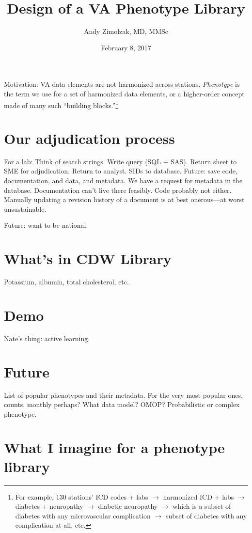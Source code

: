 \documentclass{tufte-handout}
\title{Design of a VA Phenotype Library}
\author{Andy Zimolzak, MD, MMSc}
\date{February 8, 2017}
\begin{document}
\maketitle

Motivation: VA data elements are not harmonized across stations.
\emph{Phenotype} is the term we use for a set of harmonized data
elements, or a higher-order concept made of many such ``building
blocks.''\footnote{For example, 130 stations' ICD codes + labs $\to$
  harmonized ICD + labs $\to$ diabetes + neuropathy $\to$ diabetic
  neuropathy $\to$ which is a subset of diabetes with any
  microvascular complication $\to$ subset of diabetes with any
  complication at all, etc.}

\section{Our adjudication process}

For a lab: Think of search strings. Write query (SQL + SAS). Return
sheet to SME for adjudication. Return to analyst. SIDs to database.
Future: save code, documentation, and data, and metadata. We have a
request for metadata in the database. Documentation can't live there
feasibly. Code probably not either. Manually updating a revision
history of a document is at best onerous---at worst unsustainable.

Future: want to be national.  


\section{What's in CDW Library}

Potassium, albumin, total cholesterol, etc. 

\section{Demo}

Nate's thing: active learning.

\section{Future}

List of popular phenotypes and their metadata. For the very most
popular ones, counts, monthly perhaps? What data model? OMOP?
Probabilistic or complex phenotype. 

\section{What I imagine for a phenotype library}
\end{document}
